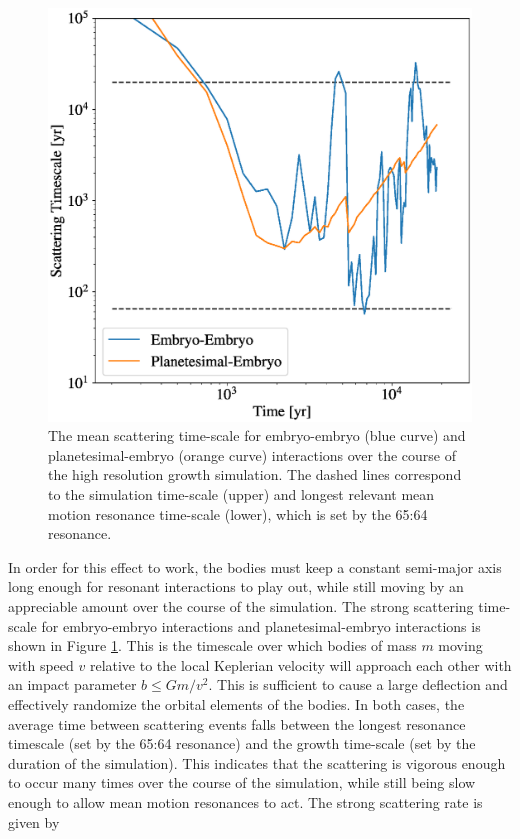 \begin{figure}
    \includegraphics[width=\columnwidth]{figures/plSS/scatter_timescale.eps}
    \caption{The mean scattering time-scale for embryo-embryo (blue curve) and planetesimal-embryo (orange curve) interactions 
    over the course of the high resolution growth simulation. The dashed lines correspond to the simulation time-scale (upper) and 
    longest relevant mean motion resonance time-scale (lower), which is set by the 65:64 resonance.}
    \label{fig:scatter_timescale}
\end{figure}


In order for this effect to work, the bodies must keep a constant semi-major axis long enough for resonant interactions to play 
out, while still moving by an appreciable amount over the course of the simulation. The strong scattering time-scale for embryo-embryo interactions and planetesimal-embryo interactions is shown in Figure \ref{fig:scatter_timescale}. This is the timescale 
over which bodies of mass $m$ moving with speed $v$ relative to the local Keplerian velocity will approach each other with an 
impact parameter $b \leq G m / v^{2}$. This is sufficient to cause a large deflection and effectively randomize the orbital 
elements of the bodies. In both cases, the average time between scattering events falls between the longest resonance timescale (set by the 65:64 resonance) and the growth time-scale (set by the duration of the simulation). This indicates that the 
scattering is vigorous enough to occur many times over the course of the simulation, while still being slow enough to allow mean 
motion resonances to act. The strong scattering rate is given by

